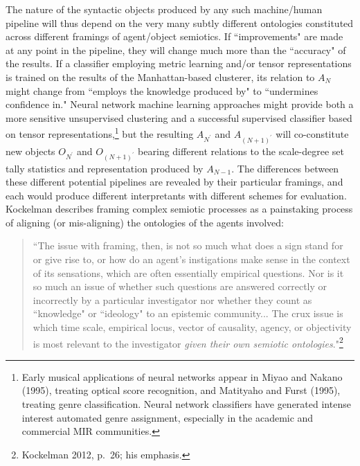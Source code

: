 The nature of the syntactic objects produced by any such machine/human pipeline will thus depend on the very many subtly different ontologies constituted across different framings of agent/object semiotics.  If ``improvements" are made at any point in the pipeline, they will change much more than the ``accuracy" of the results.  If a classifier employing metric learning and/or tensor representations is trained on the results of the Manhattan-based clusterer, its relation to $A_N$ might change from ``employs the knowledge produced by"  to ``undermines confidence in."  Neural network machine learning approaches might provide both a more sensitive unsupervised clustering and a successful supervised classifier based on tensor representations,\footnote{Early musical applications of neural networks appear in Miyao and Nakano (1995), treating optical score recognition, and Matityaho and Furst (1995), treating genre classification.  Neural network classifiers have generated intense interest automated genre assignment, especially in the academic and commercial MIR communities.} but the resulting $A_{N^{\prime}}$ and $A_{(N+1)^{\prime}}$ will co-constitute new objects $O_{N^{\prime}}$ and $O_{(N+1)^{\prime}}$ bearing different relations to the scale-degree set tally statistics and representation produced by $A_{N-1}$.  The differences between these different potential pipelines are revealed by their particular framings, and each would produce different interpretants with different schemes for evaluation.  Kockelman describes framing complex semiotic processes as a painstaking process of aligning (or mis-aligning) the ontologies of the agents involved:
\begin{quote}
``The issue with framing, then, is not so much what does a sign stand for or give rise to, or how do an agent's instigations make sense in the context of its sensations, which are often essentially empirical questions.  Nor is it so much an issue of whether such questions are answered correctly or incorrectly by a particular investigator nor whether they count as ``knowledge" or ``ideology" to an epistemic community... The crux issue is which time scale, empirical locus, vector of causality, agency, or objectivity is most relevant to the investigator \emph{given their own semiotic ontologies}."\footnote{Kockelman 2012, p.\ 26; his emphasis.}
\end{quote}
